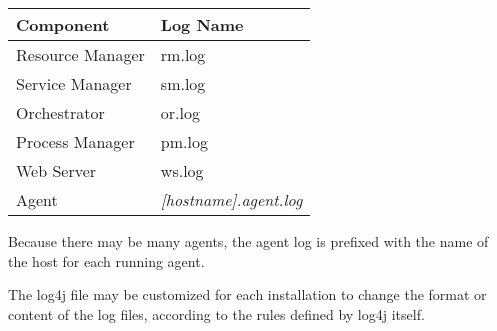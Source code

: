     \begin{tabular} {| l | l |}
       \hline
          Component & Log Name \\
      \hline
      \hline
          Resource Manager & rm.log \\
      \hline
          Service Manager & sm.log \\
      \hline
          Orchestrator & or.log \\
      \hline
          Process Manager & pm.log \\
      \hline
          Web Server & ws.log \\
      \hline
          Agent & {\em [hostname].agent.log } \\
      \hline
    \end{tabular}
    
    Because there may be many agents, the agent log is prefixed with the name of the host for
    each running agent.

    The log4j file may be customized for each installation to change the format or content of the
    log files, according to the rules defined by log4j itself.

